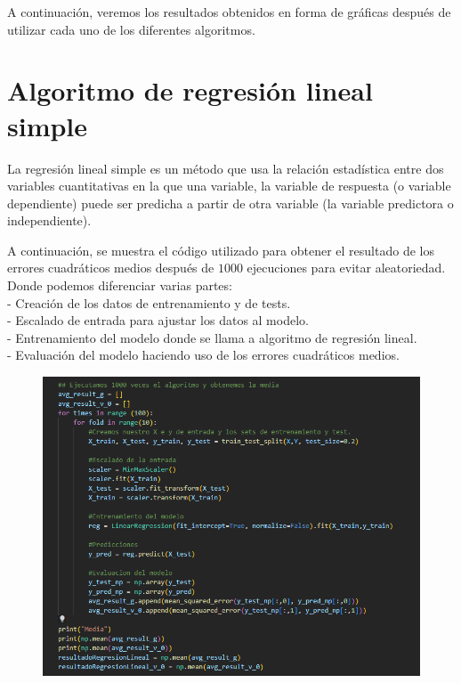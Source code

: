 \documentclass[oneside,openright,titlepage,numbers=noenddot,openany,headinclude,footinclude=true,
cleardoublepage=empty,abstractoff,BCOR=5mm,paper=a4,fontsize=12pt,main=spanish]{scrreprt}
\begin{document}
A continuación, veremos los resultados obtenidos en forma de gráficas después de utilizar cada uno de los diferentes algoritmos.


\section{Algoritmo de regresión lineal simple}

La regresión lineal simple es un método que usa la relación estadística entre dos variables cuantitativas en la que una variable, la variable de respuesta (o variable dependiente) puede ser predicha a partir de otra variable (la variable predictora o independiente). 

A continuación, se muestra el código utilizado para obtener el resultado de los errores cuadráticos medios después de $1000$ ejecuciones para evitar aleatoriedad. Donde podemos diferenciar varias partes:\\
- Creación de los datos de entrenamiento y de tests.\\
- Escalado de entrada para ajustar los datos al modelo.\\
- Entrenamiento del modelo donde se llama a algoritmo de regresión lineal.\\
- Evaluación del modelo haciendo uso de los errores cuadráticos medios.

\begin{figure}[H]
	\centering
	\includegraphics[width=15cm]{Código algoritmo lineal simple.png}
\end{figure}
\end{document}
